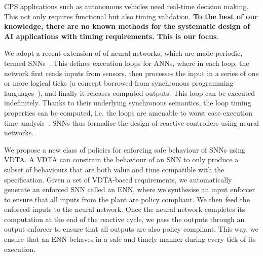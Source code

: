 
CPS applications such as autonomous vehicles need real-time decision
making. This not only requires functional but also timing
validation. {\bf To the best of our knowledge,
there are no known methods for the systematic design of 
AI applications with timing requirements. This is our focus}.

We adopt a recent extension of of neural networks,
which are made periodic, termed \acfp{SNN}~\cite{sann}. 
This defines execution loops for \acp{ANN}, 
where in each loop, the network first reads
inputs from sensors, then processes the input in
a series of one or more logical ticks (a concept borrowed from synchronous programming languages~\cite{SynchronousLanguages12YearsLater}),
and finally it releases computed outputs.
This loop can be executed indefinitely.
Thanks to their underlying synchronous semantics, the loop timing properties can be computed, i.e. the loops are amenable to worst case execution time analysis~\cite{TheWCETProblem}. 
\acp{SNN} thus formalise the design of reactive controllers using neural networks.

We propose a new class of policies for enforcing safe behaviour
of \acp{SNN} using \ac{VDTA}. A \ac{VDTA} can
constrain the behaviour of an \ac{SNN} to only produce a subset of
behaviours that are both value and time compatible with the
specification. Given a set of \ac{VDTA}-based requirements, we
automatically generate an enforced \ac{SNN} called an \acf{ENN}, where we synthesise an input enforcer to  ensure that all
inputs from the plant are policy compliant. We then feed the enforced
inputs to the neural network. Once the neural network completes its
computation at the end of the reactive cycle, we pass the outputs
through an output enforcer to ensure that all outputs are also policy
compliant. This way, we ensure that an \ac{ENN} behaves in a safe and
timely manner during every tick of its execution.

